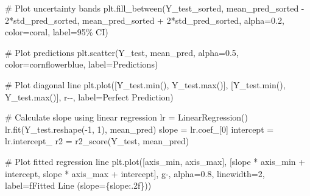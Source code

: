 \documentclass[
  letterpaper,
  DIV=11,
  numbers=noendperiod]{scrreprt}
\newenvironment{Shaded}{\begin{snugshade}}{\end{snugshade}}
\newcommand{\BuiltInTok}[1]{\textcolor[rgb]{0.00,0.23,0.31}{#1}}
\newcommand{\CommentTok}[1]{\textcolor[rgb]{0.37,0.37,0.37}{#1}}
\newcommand{\DecValTok}[1]{\textcolor[rgb]{0.68,0.00,0.00}{#1}}
\newcommand{\FloatTok}[1]{\textcolor[rgb]{0.68,0.00,0.00}{#1}}
\newcommand{\NormalTok}[1]{\textcolor[rgb]{0.00,0.23,0.31}{#1}}
\newcommand{\OperatorTok}[1]{\textcolor[rgb]{0.37,0.37,0.37}{#1}}
\newcommand{\SpecialCharTok}[1]{\textcolor[rgb]{0.37,0.37,0.37}{#1}}
\newcommand{\SpecialStringTok}[1]{\textcolor[rgb]{0.13,0.47,0.30}{#1}}
\newcommand{\StringTok}[1]{\textcolor[rgb]{0.13,0.47,0.30}{#1}}
\begin{document}
\begin{Shaded}
\begin{Highlighting}[]
    \CommentTok{\# Plot uncertainty bands}
\NormalTok{    plt.fill\_between(Y\_test\_sorted,}
\NormalTok{                    mean\_pred\_sorted }\OperatorTok{{-}} \DecValTok{2}\OperatorTok{*}\NormalTok{std\_pred\_sorted,}
\NormalTok{                    mean\_pred\_sorted }\OperatorTok{+} \DecValTok{2}\OperatorTok{*}\NormalTok{std\_pred\_sorted,}
\NormalTok{                    alpha}\OperatorTok{=}\FloatTok{0.2}\NormalTok{, color}\OperatorTok{=}\StringTok{\textquotesingle{}coral\textquotesingle{}}\NormalTok{, label}\OperatorTok{=}\StringTok{\textquotesingle{}95\% CI\textquotesingle{}}\NormalTok{)}

    \CommentTok{\# Plot predictions}
\NormalTok{    plt.scatter(Y\_test, mean\_pred, alpha}\OperatorTok{=}\FloatTok{0.5}\NormalTok{, color}\OperatorTok{=}\StringTok{\textquotesingle{}cornflowerblue\textquotesingle{}}\NormalTok{, label}\OperatorTok{=}\StringTok{\textquotesingle{}Predictions\textquotesingle{}}\NormalTok{)}

    \CommentTok{\# Plot diagonal line}
\NormalTok{    plt.plot([Y\_test.}\BuiltInTok{min}\NormalTok{(), Y\_test.}\BuiltInTok{max}\NormalTok{()],}
\NormalTok{             [Y\_test.}\BuiltInTok{min}\NormalTok{(), Y\_test.}\BuiltInTok{max}\NormalTok{()],}
             \StringTok{\textquotesingle{}r{-}{-}\textquotesingle{}}\NormalTok{, label}\OperatorTok{=}\StringTok{\textquotesingle{}Perfect Prediction\textquotesingle{}}\NormalTok{)}

    \CommentTok{\# Calculate slope using linear regression}
\NormalTok{    lr }\OperatorTok{=}\NormalTok{ LinearRegression()}
\NormalTok{    lr.fit(Y\_test.reshape(}\OperatorTok{{-}}\DecValTok{1}\NormalTok{, }\DecValTok{1}\NormalTok{), mean\_pred)}
\NormalTok{    slope }\OperatorTok{=}\NormalTok{ lr.coef\_[}\DecValTok{0}\NormalTok{]}
\NormalTok{    intercept }\OperatorTok{=}\NormalTok{ lr.intercept\_}
\NormalTok{    r2 }\OperatorTok{=}\NormalTok{ r2\_score(Y\_test, mean\_pred)}

    \CommentTok{\# Plot fitted regression line}
\NormalTok{    plt.plot([axis\_min, axis\_max],}
\NormalTok{             [slope }\OperatorTok{*}\NormalTok{ axis\_min }\OperatorTok{+}\NormalTok{ intercept, slope }\OperatorTok{*}\NormalTok{ axis\_max }\OperatorTok{+}\NormalTok{ intercept],}
             \StringTok{\textquotesingle{}g{-}\textquotesingle{}}\NormalTok{, alpha}\OperatorTok{=}\FloatTok{0.8}\NormalTok{, linewidth}\OperatorTok{=}\DecValTok{2}\NormalTok{, label}\OperatorTok{=}\SpecialStringTok{f\textquotesingle{}Fitted Line (slope=}\SpecialCharTok{\{}\NormalTok{slope}\SpecialCharTok{:.2f\}}\SpecialStringTok{)\textquotesingle{}}\NormalTok{)}


\end{Highlighting}
\end{Shaded}
\end{document}
